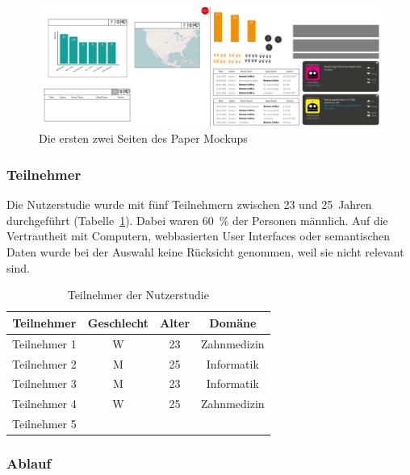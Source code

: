 \documentclass[
	headsepline,
	footsepline,
	fontsize=12pt,
	bibliography=totoc
]{scrbook}
\begin{document}
\begin{figure}[htbp]
   \centering
   \includegraphics[width=\textwidth]{images/konzeption-paper-mockup.png}
   \caption{Die ersten zwei Seiten des Paper Mockups}
   \label{figure:paper-mockup}
\end{figure}

\subsubsection{Teilnehmer}

Die Nutzerstudie wurde mit fünf Teilnehmern zwischen 23 und 25~Jahren durchgeführt (Tabelle~\ref{table:mockup:teilnehmer}). Dabei waren 60~\% der Personen männlich. Auf die Vertrautheit mit Computern, webbasierten User Interfaces oder semantischen Daten wurde bei der Auswahl keine Rücksicht genommen, weil sie nicht relevant sind.

\begin{table}[htbp]
	\centering
    \begin{tabular}{c|c|c|c}
    Teilnehmer   & Geschlecht & Alter & Domäne      \\
    \hline
    Teilnehmer 1 & W          & 23    & Zahnmedizin \\ %
    Teilnehmer 2 & M          & 25    & Informatik  \\ %
    Teilnehmer 3 & M          & 23    & Informatik  \\ %
    Teilnehmer 4 & W          & 25    & Zahnmedizin \\ %
    Teilnehmer 5 & ~          & ~     & ~           \\
    \end{tabular}
    \label{table:mockup:teilnehmer}
    \caption{Teilnehmer der Nutzerstudie}
\end{table}

\subsubsection{Ablauf}
\end{document}

